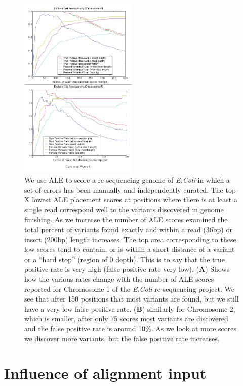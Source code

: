 \documentclass[phd,tocprelim]{cornell}
\begin{document}
\begin{figure}[hpt]
 	\centerline{\includegraphics[width=0.5\textwidth]{figures/ALE/Clark_Fig6.pdf}}
    \caption[ROC curve vs. number of reported errors]{We use ALE to score a re-sequencing genome of {\it E.Coli} in which a set of errors has
been manually and independently curated. The top X lowest ALE placement scores at positions
where there is at least a single read correspond well to the variants discovered in genome
finishing. As we increase the number of ALE scores examined the total percent of variants found
exactly and within a read (36bp) or insert (200bp) length increases. The top area corresponding to
these low scores tend to contain, or is within a short distance of a variant or a “hard stop” (region
of 0 depth). This is to say that the true positive rate is very high (false positive rate very low). ({\bf A})
Shows how the various rates change with the number of ALE scores reported for Chromosome 1
of the {\it E.Coli} re-sequencing project. We see that after 150 positions that most variants are found,
but we still have a very low false positive rate. ({\bf B}) similarly for Chromosome 2, which is smaller,
after only 75 scores most variants are discovered and the false positive rate is around 10\%. As we
look at more scores we discover more variants, but the false positive rate increases.}
 	\label{fig:ROC_ALE}
\end{figure}

\section{Influence of alignment input} %
\label{sec:Influence of alignment input}
\end{document}
